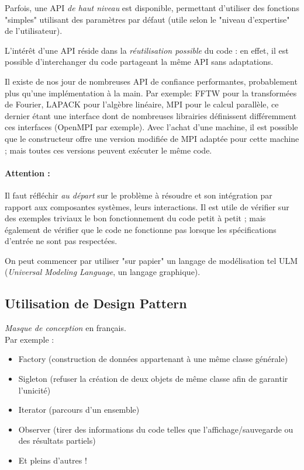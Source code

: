 \documentclass{article}
\begin{document}
Parfois, une API \emph{de haut niveau} est disponible, permettant d'utiliser des fonctions "simples" utilisant des paramètres par défaut (utile selon le "niveau d'expertise" de l'utilisateur).
\bigskip

L'intérêt d'une API réside dans la \emph{réutilisation possible} du code : en effet, il est possible d'interchanger du code partageant la même API sans adaptations.
\bigskip

Il existe de nos jour de nombreuses API de confiance performantes, probablement plus qu'une implémentation à la main. Par exemple:
FFTW pour la transformées de Fourier, LAPACK pour l'algèbre linéaire, MPI pour le calcul parallèle, ce dernier étant une interface dont de nombreuses librairies définissent différemment ces interfaces (OpenMPI par exemple). Avec l'achat d'une machine, il est possible que le constructeur offre une version modifiée de MPI adaptée pour cette machine ; mais toutes ces versions peuvent exécuter le même code.

\paragraph{Attention :} Il faut réfléchir \emph{au départ} sur le problème à résoudre et son intégration par rapport aux composantes systèmes, leurs interactions. Il est utile de vérifier sur des exemples triviaux le bon fonctionnement du code petit à petit ; mais également de vérifier que le code ne fonctionne pas lorsque les spécifications d'entrée ne sont pas respectées.

On peut commencer par utiliser "sur papier" un langage de modélisation tel ULM (\textit{Universal Modeling Language}, un langage graphique).

\subsection{Utilisation de Design Pattern}
\emph{Masque de conception} en français.\\
Par exemple :
\begin{itemize}
\item Factory (construction de données appartenant à une même classe générale)
\item Sigleton (refuser la création de deux objets de même classe afin de garantir l'unicité)
\item Iterator (parcours d'un ensemble)
\item Observer (tirer des informations du code telles que l'affichage/sauvegarde ou des résultats partiels)
\item Et pleins d'autres !
\end{itemize}
\end{document}
